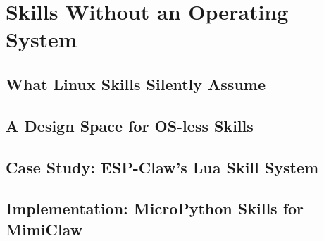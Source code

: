 \chapter{Skills Without an Operating System}
\label{ch:skills}

\section{What Linux Skills Silently Assume}
\label{sec:skill-assumptions}

\section{A Design Space for OS-less Skills}
\label{sec:skill-space}

\section{Case Study: ESP-Claw's Lua Skill System}
\label{sec:skill-espclaw}

\section{Implementation: MicroPython Skills for MimiClaw}
\label{sec:skill-impl}

